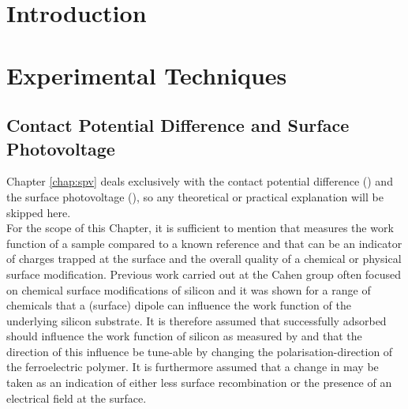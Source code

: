 \section{Introduction}

\section{\pvdf{}} 

\section{Experimental Techniques}
\subsection{Contact Potential Difference and Surface Photovoltage}
Chapter \ref{chap:spv} deals exclusively with the contact potential difference (\cpd{}) and the surface photovoltage (\spv{}), so any theoretical or practical explanation will be skipped here.\\ For the scope of this Chapter, it is sufficient to mention that \cpd{} measures the work function of a sample compared to a known reference and that \spv{} can be an indicator of charges trapped at the surface and the overall quality of a chemical or physical surface modification. Previous work carried out at the Cahen group often focused on chemical surface modifications of silicon and it was shown for a range of chemicals that a (surface) dipole can influence the work function of the underlying silicon substrate. It is therefore assumed that successfully adsorbed \pvdf{} should influence the work function of silicon as measured by \cpd{} and that the direction of this influence be tune-able by changing the polarisation-direction of the ferroelectric polymer. It is furthermore assumed that a change in \spv{} may be taken as an indication of either less surface recombination or the presence of an electrical field at the surface.

